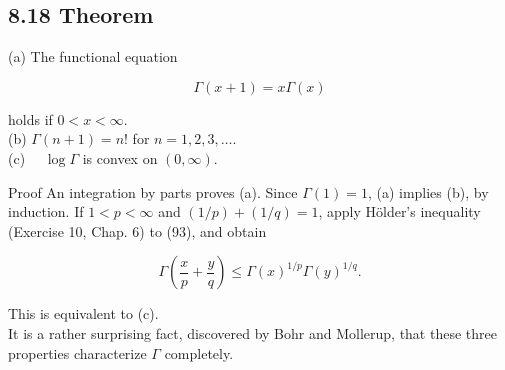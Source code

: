 \documentclass[10pt]{article}
\begin{document}
\subsection*{8.18 Theorem}
(a) The functional equation

$$
\Gamma(x+1)=x \Gamma(x)
$$

holds if $0<x<\infty$.\\
(b) $\Gamma(n+1)=n!$ for $n=1,2,3, \ldots$.\\
(c) $\quad \log \Gamma$ is convex on $(0, \infty)$.

Proof An integration by parts proves (a). Since $\Gamma(1)=1$, (a) implies (b), by induction. If $1<p<\infty$ and $(1 / p)+(1 / q)=1$, apply Hölder's inequality (Exercise 10, Chap. 6) to (93), and obtain

$$
\Gamma\left(\frac{x}{p}+\frac{y}{q}\right) \leq \Gamma(x)^{1 / p} \Gamma(y)^{1 / q} .
$$

This is equivalent to (c).\\
It is a rather surprising fact, discovered by Bohr and Mollerup, that these three properties characterize $\Gamma$ completely.
\end{document}
